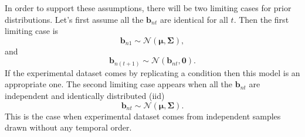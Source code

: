 In order to support these assumptions, there will be two limiting cases for prior distributions. Let's first assume all the $\textbf{b}_{nt}$ are identical for all $t$. Then the first limiting case is
\begin{equation} \label{eq:limit_one_a}
\textbf{b}_{n1} \sim \mathcal{N} ( \boldsymbol{\mu},\boldsymbol{\Sigma}), 
\end{equation}
and
\begin{equation} \label{eq:limit_one_b}
\textbf{b}_{n(t+1)} \sim \mathcal{N} ( \textbf{b}_{nt},\textbf{0}).
\end{equation}
If the experimental dataset comes by replicating a condition then this model is an appropriate one. The second limiting case appears when all the $\textbf{b}_{nt}$ are independent and identically distributed (iid)
\begin{equation} \label{eq:limit_two}
\textbf{b}_{nt}\sim \mathcal{N} ( \boldsymbol{\mu},\boldsymbol{\Sigma}).
\end{equation}
This is the case when experimental dataset comes from independent samples drawn without any temporal order.

